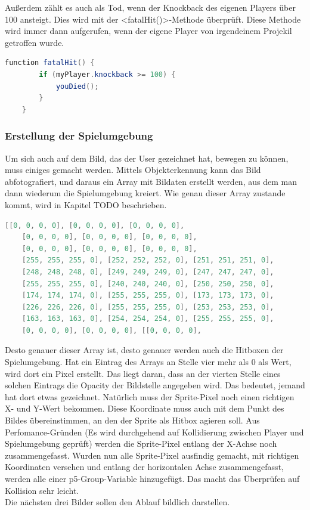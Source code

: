 Außerdem zählt es auch als Tod, wenn der Knockback des eigenen Players über 100 ansteigt. Dies wird mit der <fatalHit()>-Methode überprüft.
Diese Methode wird immer dann aufgerufen, wenn der eigene Player von irgendeinem Projekil getroffen wurde.
\begin{lstlisting}[caption=Fatal Hit,language=Java,label=lst:impl:falatHit]
    function fatalHit() {
        if (myPlayer.knockback >= 100) {
            youDied();
        }
    } 
\end{lstlisting}

\subsubsection{Erstellung der Spielumgebung} \label{impl:Spielumgebung}
Um sich auch auf dem Bild, das der User gezeichnet hat, bewegen zu können, muss einiges gemacht werden. Mittels Objekterkennung kann das Bild abfotografiert, 
und daraus ein Array mit Bildaten erstellt werden, aus dem man dann wiederum die Spielumgebung kreiert. Wie genau dieser Array zustande kommt, wird in Kapitel TODO beschrieben.
\\
\begin{lstlisting}[caption=Vereinfachte Darstellung eines Bilddaten-Arrays,language=Java,label=lst:impl:bilddaten]
    [[0, 0, 0, 0], [0, 0, 0, 0], [0, 0, 0, 0],
    [0, 0, 0, 0], [0, 0, 0, 0], [0, 0, 0, 0],
    [0, 0, 0, 0], [0, 0, 0, 0], [0, 0, 0, 0],
    [255, 255, 255, 0], [252, 252, 252, 0], [251, 251, 251, 0],
    [248, 248, 248, 0], [249, 249, 249, 0], [247, 247, 247, 0],
    [255, 255, 255, 0], [240, 240, 240, 0], [250, 250, 250, 0],
    [174, 174, 174, 0], [255, 255, 255, 0], [173, 173, 173, 0],
    [226, 226, 226, 0], [255, 255, 255, 0], [253, 253, 253, 0],
    [163, 163, 163, 0], [254, 254, 254, 0], [255, 255, 255, 0],
    [0, 0, 0, 0], [0, 0, 0, 0], [[0, 0, 0, 0],
\end{lstlisting}

Desto genauer dieser Array ist, desto genauer werden auch die Hitboxen der Spielumgebung.
Hat ein Eintrag des Arrays an Stelle vier mehr als 0 als Wert, wird dort ein Pixel erstellt. Das liegt daran, dass an der vierten Stelle eines solchen Eintrags die Opacity der Bildstelle angegeben wird. Das bedeutet, jemand hat dort etwas gezeichnet.
Natürlich muss der Sprite-Pixel noch einen richtigen X- und Y-Wert bekommen. Diese Koordinate muss auch mit dem Punkt des Bildes übereinstimmen, an den der Sprite als Hitbox agieren soll.
Aus Perfomance-Gründen (Es wird durchgehend auf Kollidierung zwischen Player und Spielumgebung geprüft) werden die Sprite-Pixel entlang der X-Achse noch zusammengefasst.
Wurden nun alle Sprite-Pixel ausfindig gemacht, mit richtigen Koordinaten versehen und entlang der horizontalen Achse zusammengefasst, werden alle einer p5-Group-Variable hinzugefügt.
Das macht das Überprüfen auf Kollision sehr leicht. \\
Die nächsten drei Bilder sollen den Ablauf bildlich darstellen.


